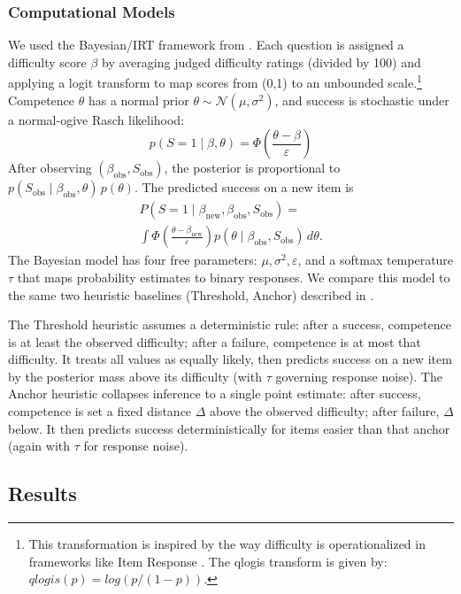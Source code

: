 \documentclass[10pt,letterpaper]{article}
\begin{document}
\subsubsection{Computational Models}\label{computational-models}
We used the Bayesian/IRT framework from \citet{Mercier-2025c}. Each question is assigned a difficulty score \(\beta\) by averaging judged difficulty ratings (divided by 100) and applying a logit transform to map scores from (0,1) to an unbounded scale.\footnote{This transformation is inspired by the way difficulty is operationalized in frameworks like Item Response \citet{Rasch-1960}. The qlogis transform is given by: \(qlogis(p) = log(p/(1-p))\).} Competence \(\theta\) has a normal prior \(\theta \sim \mathcal{N}(\mu,\sigma^2)\), and success is stochastic under a normal-ogive Rasch likelihood:
\begin{equation}
p(S=1 \mid \beta,\theta)=\Phi\!\left(\frac{\theta-\beta}{\varepsilon}\right)
\end{equation}
After observing \((\beta_{\text{obs}}, S_{\text{obs}})\), the posterior is proportional to \(p(S_{\text{obs}}\mid \beta_{\text{obs}},\theta)\,p(\theta)\). The predicted success on a new item is
\begin{multline}
P(S=1 \mid \beta_{\text{new}},\beta_{\text{obs}},S_{\text{obs}})= \\
\int \Phi\!\left(\frac{\theta-\beta_{\text{new}}}{\varepsilon}\right)
p(\theta \mid \beta_{\text{obs}},S_{\text{obs}})\,d\theta.
\end{multline}
The Bayesian model has four free parameters: \(\mu,\sigma^2,\varepsilon\), and a softmax temperature \(\tau\) that maps probability estimates to binary responses. We compare this model to the same two heuristic baselines (Threshold, Anchor) described in \citet{Mercier-2025c}.

The Threshold heuristic assumes a deterministic rule: after a success, competence is at least the observed difficulty; after a failure, competence is at most that difficulty. It treats all values as equally likely, then predicts success on a new item by the posterior mass above its difficulty (with \(\tau\) governing response noise). The Anchor heuristic collapses inference to a single point estimate: after success, competence is set a fixed distance \(\Delta\) above the observed difficulty; after failure, \(\Delta\) below. It then predicts success deterministically for items easier than that anchor (again with \(\tau\) for response noise).

\subsection{Results}
\end{document}

